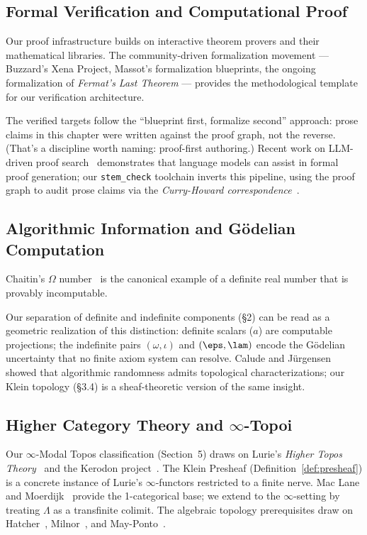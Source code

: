 \subsection*{Formal Verification and Computational Proof}

Our proof infrastructure builds on interactive theorem provers and their mathematical libraries. The community-driven formalization movement --- Buzzard's Xena Project, Massot's formalization blueprints, the ongoing formalization of \emph{Fermat's Last Theorem} --- provides the methodological template for our verification architecture.

The verified targets follow the ``blueprint first, formalize second'' approach: prose claims in this chapter were written against the proof graph, not the reverse. (That's a discipline worth naming: proof-first authoring.) Recent work on LLM-driven proof search~\cite{autoformbot,safe-verification} demonstrates that language models can assist in formal proof generation; our \texttt{stem\_check} toolchain inverts this pipeline, using the proof graph to audit prose claims via the \emph{Curry-Howard correspondence}~\cite{curry-howard}.

\subsection*{Algorithmic Information and G\"odelian Computation}

Chaitin's $\Omega$ number~\cite{chaitin-omega} is the canonical example of a definite real number that is provably incomputable.

Our separation of definite and indefinite components (\S2) can be read as a geometric realization of this distinction: definite scalars ($a$) are computable projections; the indefinite pairs $(\omega, \iota)$ and $(\eps, \lam)$ encode the G\"odelian uncertainty that no finite axiom system can resolve. Calude and J\"urgensen~\cite{calude-randomness} showed that algorithmic randomness admits topological characterizations; our Klein topology (\S3.4) is a sheaf-theoretic version of the same insight.

\subsection*{Higher Category Theory and $\infty$-Topoi}

Our $\infty$-Modal Topos classification (Section~5) draws on Lurie's \emph{Higher Topos Theory}~\cite{lurie-htt} and the Kerodon project~\cite{kerodon}. The Klein Presheaf (Definition~\ref{def:presheaf}) is a concrete instance of Lurie's $\infty$-functors restricted to a finite nerve. Mac Lane and Moerdijk~\cite{maclane-moerdijk} provide the 1-categorical base; we extend to the $\infty$-setting by treating $\Lambda$ as a transfinite colimit. The algebraic topology prerequisites draw on Hatcher~\cite{hatcher}, Milnor~\cite{milnor}, and May-Ponto~\cite{may-ponto}.





